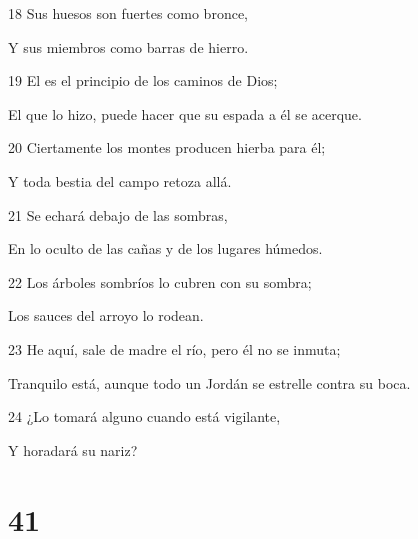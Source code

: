 \par 18 Sus huesos son fuertes como bronce,
\par Y sus miembros como barras de hierro. 
\par 19 El es el principio de los caminos de Dios;
\par El que lo hizo, puede hacer que su espada a él se acerque. 
\par 20 Ciertamente los montes producen hierba para él;
\par Y toda bestia del campo retoza allá.
\par 21 Se echará debajo de las sombras,
\par En lo oculto de las cañas y de los lugares húmedos.
\par 22 Los árboles sombríos lo cubren con su sombra;
\par Los sauces del arroyo lo rodean. 
\par 23 He aquí, sale de madre el río, pero él no se inmuta;
\par Tranquilo está, aunque todo un Jordán se estrelle contra su boca. 
\par 24 ¿Lo tomará alguno cuando está vigilante,
\par Y horadará su nariz?

\chapter{41}

